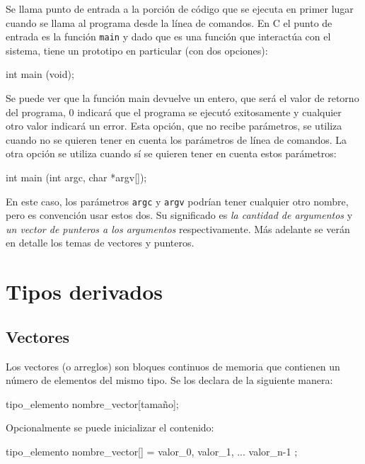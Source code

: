 Se llama punto de entrada a la porción de código que se ejecuta en primer
lugar cuando se llama al programa desde la línea de comandos. En C el punto de
entrada es la función \lstinline!main! y dado que es una función que
interactúa con el sistema, tiene un prototipo en particular (con dos
opciones):

\begin{codigo-c-plano}
int main (void);
\end{codigo-c-plano}

Se puede ver que la función main devuelve un entero, que será el valor de
retorno del programa, 0 indicará que el programa se ejecutó exitosamente y
cualquier otro valor indicará un error. Esta opción, que no recibe parámetros,
se utiliza cuando no se quieren tener en cuenta los parámetros de línea de
comandos.  La otra opción se utiliza cuando sí se quieren tener en cuenta
estos parámetros:

\begin{codigo-c-plano}
int main (int argc, char *argv[]);
\end{codigo-c-plano}

En este caso, los parámetros \lstinline!argc! y \lstinline!argv! podrían tener
cualquier otro nombre, pero es convención usar estos dos. Su significado es
\emph{la cantidad de argumentos} y \emph{un vector de punteros a los
argumentos} respectivamente.  Más adelante se verán en detalle los temas de
vectores y punteros.


\section{Tipos derivados}

\subsection{Vectores}

Los vectores (o arreglos) son bloques continuos de memoria que contienen un
número de elementos del mismo tipo. Se los declara de la siguiente manera:

\begin{codigo-c-plano}
tipo_elemento nombre_vector[tamaño];
\end{codigo-c-plano}

Opcionalmente se puede inicializar el contenido:

\begin{codigo-c-plano}
tipo_elemento nombre_vector[] = { valor_0, valor_1, ... valor_n-1 };
\end{codigo-c-plano}

